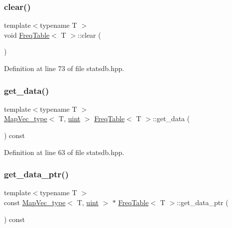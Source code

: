\subsubsection{\texorpdfstring{clear()}{clear()}}
{\footnotesize\ttfamily template$<$typename T $>$ \\
void \hyperlink{class_freq_table}{Freq\+Table}$<$ T $>$\+::clear (\begin{DoxyParamCaption}{ }\end{DoxyParamCaption})\hspace{0.3cm}{\ttfamily [inline]}}



Definition at line 73 of file statsdb.\+hpp.

\mbox{\label{class_freq_table_a7b99496d1c2f4193654752856b30d1a5}} 
\subsubsection{\texorpdfstring{get\+\_\+data()}{get\_data()}}
{\footnotesize\ttfamily template$<$typename T $>$ \\
\hyperlink{typedefs_8hpp_a02ed8dec96bc528c8bc3d8cb3c4674a5}{Map\+Vec\+\_\+type}$<$ T, \hyperlink{typedefs_8hpp_a91ad9478d81a7aaf2593e8d9c3d06a14}{uint} $>$ \hyperlink{class_freq_table}{Freq\+Table}$<$ T $>$\+::get\+\_\+data (\begin{DoxyParamCaption}{ }\end{DoxyParamCaption}) const\hspace{0.3cm}{\ttfamily [inline]}}



Definition at line 63 of file statsdb.\+hpp.

\mbox{\label{class_freq_table_ab5dd6677f52072c93d18b2b9a3369ae7}} 
\subsubsection{\texorpdfstring{get\+\_\+data\+\_\+ptr()}{get\_data\_ptr()}}
{\footnotesize\ttfamily template$<$typename T $>$ \\
const \hyperlink{typedefs_8hpp_a02ed8dec96bc528c8bc3d8cb3c4674a5}{Map\+Vec\+\_\+type}$<$ T, \hyperlink{typedefs_8hpp_a91ad9478d81a7aaf2593e8d9c3d06a14}{uint} $>$ $\ast$ \hyperlink{class_freq_table}{Freq\+Table}$<$ T $>$\+::get\+\_\+data\+\_\+ptr (\begin{DoxyParamCaption}{ }\end{DoxyParamCaption}) const\hspace{0.3cm}{\ttfamily [inline]}}



